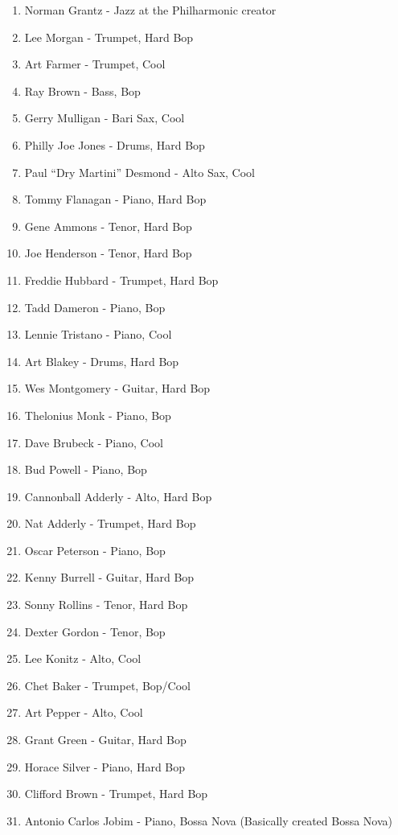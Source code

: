 \documentclass[]{article}
\date{}
\providecommand{\tightlist}{%
  \setlength{\itemsep}{0pt}\setlength{\parskip}{0pt}}
\begin{document}
\begin{enumerate}
\def\labelenumi{\arabic{enumi}.}
\tightlist
\item
  Norman Grantz - Jazz at the Philharmonic creator
\item
  Lee Morgan - Trumpet, Hard Bop
\item
  Art Farmer - Trumpet, Cool
\item
  Ray Brown - Bass, Bop
\item
  Gerry Mulligan - Bari Sax, Cool
\item
  Philly Joe Jones - Drums, Hard Bop
\item
  Paul ``Dry Martini'' Desmond - Alto Sax, Cool
\item
  Tommy Flanagan - Piano, Hard Bop
\item
  Gene Ammons - Tenor, Hard Bop
\item
  Joe Henderson - Tenor, Hard Bop
\item
  Freddie Hubbard - Trumpet, Hard Bop
\item
  Tadd Dameron - Piano, Bop
\item
  Lennie Tristano - Piano, Cool
\item
  Art Blakey - Drums, Hard Bop
\item
  Wes Montgomery - Guitar, Hard Bop
\item
  Thelonius Monk - Piano, Bop
\item
  Dave Brubeck - Piano, Cool
\item
  Bud Powell - Piano, Bop
\item
  Cannonball Adderly - Alto, Hard Bop
\item
  Nat Adderly - Trumpet, Hard Bop
\item
  Oscar Peterson - Piano, Bop
\item
  Kenny Burrell - Guitar, Hard Bop
\item
  Sonny Rollins - Tenor, Hard Bop
\item
  Dexter Gordon - Tenor, Bop
\item
  Lee Konitz - Alto, Cool
\item
  Chet Baker - Trumpet, Bop/Cool
\item
  Art Pepper - Alto, Cool
\item
  Grant Green - Guitar, Hard Bop
\item
  Horace Silver - Piano, Hard Bop
\item
  Clifford Brown - Trumpet, Hard Bop
\item
  Antonio Carlos Jobim - Piano, Bossa Nova (Basically created Bossa
  Nova)

\end{enumerate}
\end{document}
